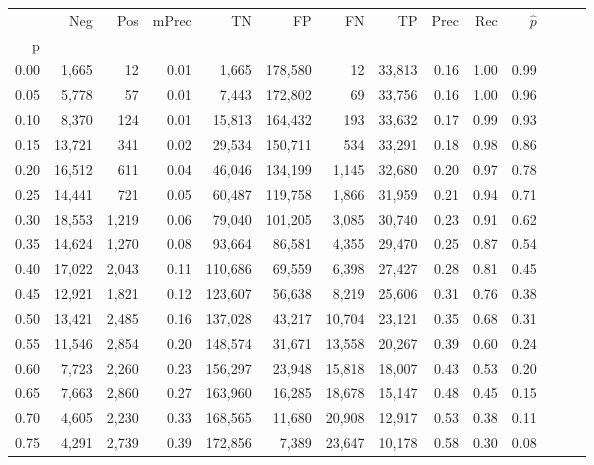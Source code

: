 \begin{tabular}{rrrrrrrrrrrrrr}
\toprule
{} &     Neg &    Pos & mPrec &       TN &       FP &      FN &      TP &  Prec &   Rec & $\hat{p}$ \\
p    &         &        &       &          &          &         &         &       &       &           \\
\midrule
0.00 &   1,665 &     12 &  0.01 &    1,665 &  178,580 &      12 &  33,813 &  0.16 &  1.00 &      0.99 \\
0.05 &   5,778 &     57 &  0.01 &    7,443 &  172,802 &      69 &  33,756 &  0.16 &  1.00 &      0.96 \\
0.10 &   8,370 &    124 &  0.01 &   15,813 &  164,432 &     193 &  33,632 &  0.17 &  0.99 &      0.93 \\
0.15 &  13,721 &    341 &  0.02 &   29,534 &  150,711 &     534 &  33,291 &  0.18 &  0.98 &      0.86 \\
0.20 &  16,512 &    611 &  0.04 &   46,046 &  134,199 &   1,145 &  32,680 &  0.20 &  0.97 &      0.78 \\
0.25 &  14,441 &    721 &  0.05 &   60,487 &  119,758 &   1,866 &  31,959 &  0.21 &  0.94 &      0.71 \\
0.30 &  18,553 &  1,219 &  0.06 &   79,040 &  101,205 &   3,085 &  30,740 &  0.23 &  0.91 &      0.62 \\
0.35 &  14,624 &  1,270 &  0.08 &   93,664 &   86,581 &   4,355 &  29,470 &  0.25 &  0.87 &      0.54 \\
0.40 &  17,022 &  2,043 &  0.11 &  110,686 &   69,559 &   6,398 &  27,427 &  0.28 &  0.81 &      0.45 \\
0.45 &  12,921 &  1,821 &  0.12 &  123,607 &   56,638 &   8,219 &  25,606 &  0.31 &  0.76 &      0.38 \\
0.50 &  13,421 &  2,485 &  0.16 &  137,028 &   43,217 &  10,704 &  23,121 &  0.35 &  0.68 &      0.31 \\
0.55 &  11,546 &  2,854 &  0.20 &  148,574 &   31,671 &  13,558 &  20,267 &  0.39 &  0.60 &      0.24 \\
0.60 &   7,723 &  2,260 &  0.23 &  156,297 &   23,948 &  15,818 &  18,007 &  0.43 &  0.53 &      0.20 \\
0.65 &   7,663 &  2,860 &  0.27 &  163,960 &   16,285 &  18,678 &  15,147 &  0.48 &  0.45 &      0.15 \\
0.70 &   4,605 &  2,230 &  0.33 &  168,565 &   11,680 &  20,908 &  12,917 &  0.53 &  0.38 &      0.11 \\
0.75 &   4,291 &  2,739 &  0.39 &  172,856 &    7,389 &  23,647 &  10,178 &  0.58 &  0.30 &      0.08 \\

\end{tabular}
